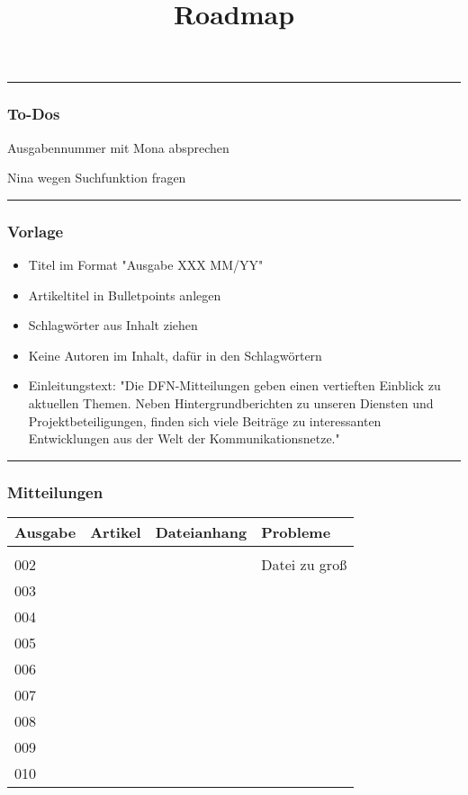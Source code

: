 \documentclass[
]{article}
\title{Roadmap}
\author{}
\date{}
\providecommand{\tightlist}{%
  \setlength{\itemsep}{0pt}\setlength{\parskip}{0pt}}
\begin{document}
\maketitle

\begin{center}\rule{0.5\linewidth}{0.5pt}\end{center}

\subsubsection{To-Dos}\label{to-dos}

Ausgabennummer mit Mona absprechen

Nina wegen Suchfunktion fragen

\begin{center}\rule{0.5\linewidth}{0.5pt}\end{center}

\subsubsection{Vorlage}\label{vorlage}

\begin{itemize}
\tightlist
\item
  Titel im Format "Ausgabe XXX \textbar{} MM/YY"
\item
  Artikeltitel in Bulletpoints anlegen
\item
  Schlagwörter aus Inhalt ziehen
\item
  Keine Autoren im Inhalt, dafür in den Schlagwörtern
\item
  Einleitungstext: "Die DFN-Mitteilungen geben einen vertieften Einblick
  zu aktuellen Themen. Neben Hintergrundberichten zu unseren Diensten
  und Projektbeteiligungen, finden sich viele Beiträge zu interessanten
  Entwicklungen aus der Welt der Kommunikationsnetze."
\end{itemize}

\begin{center}\rule{0.5\linewidth}{0.5pt}\end{center}

\subsubsection{Mitteilungen}\label{mitteilungen}

\begin{longtable}[]{@{}llll@{}}
\toprule\noalign{}
Ausgabe & Artikel & Dateianhang & Probleme \\
\midrule\noalign{}
\endhead
\bottomrule\noalign{}
\endlastfoot
001 & & & \\
002 & & & Datei zu groß \\
003 & & & \\
004 & & & \\
005 & & & \\
006 & & & \\
007 & & & \\
008 & & & \\
009 & & & \\
010 & & & \\
\end{longtable}
\end{document}
